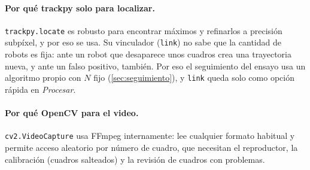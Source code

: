 \paragraph{Por qué trackpy solo para localizar.} \texttt{trackpy.locate} es robusto para encontrar
máximos y refinarlos a precisión subpíxel, y por eso se usa. Su vinculador (\texttt{link}) no sabe que
la cantidad de robots es fija: ante un robot que desaparece unos cuadros crea una trayectoria nueva,
y ante un falso positivo, también. Por eso el seguimiento del ensayo usa un algoritmo propio con
$N$ fijo (\cref{sec:seguimiento}), y \texttt{link} queda solo como opción rápida en \emph{Procesar}.

\paragraph{Por qué OpenCV para el video.} \texttt{cv2.VideoCapture} usa FFmpeg internamente: lee
cualquier formato habitual y permite acceso aleatorio por número de cuadro, que necesitan el
reproductor, la calibración (cuadros salteados) y la revisión de cuadros con problemas.
